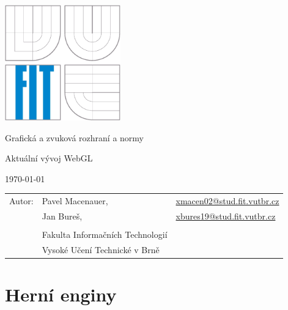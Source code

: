 \documentclass[12pt,a4paper,titlepage,final]{report}
\makeatletter
\newcommand\Course{	Grafická a zvuková rozhraní a normy}
\newcommand\WorkTitle{Aktuální vývoj WebGL}
\newcommand\AuthorA{Pavel Macenauer}
\newcommand\AuthorB{Jan Bureš}
\newcommand\AuthorAEmail{xmacen02@stud.fit.vutbr.cz}
\newcommand\AuthorBEmail{xbures19@stud.fit.vutbr.cz}
\newcommand\Faculty{Fakulta Informačních Technologií}
\newcommand\School{Vysoké Učení Technické v Brně}
\makeatother
\begin{document}
	\begin{titlepage}
	\begin{center}
		\includegraphics[height=5cm]{images/logo.eps}
	\end{center}
	\vfill
	\begin{center}
		\begin{Large}
			\Course\\
		\end{Large}
		\bigskip
		\begin{Huge}
			\WorkTitle\\
		\end{Huge}
	\end{center}
	\vfill
	\begin{center}
		\begin{large}
			\today
		\end{large}
	\end{center}
	\vfill
	\begin{flushleft}
		\begin{large}
			\begin{tabular}{lll}
				Autor: & \AuthorA, & \url{\AuthorAEmail} \\
				& \AuthorB, & \url{\AuthorBEmail} \\
		
				& & \\
				& \Faculty \\
				& \School \\
			\end{tabular}
		\end{large}
	\end{flushleft}
\end{titlepage}		

	
	
\tableofcontents

\newpage
\section{Herní enginy}
\end{document}
